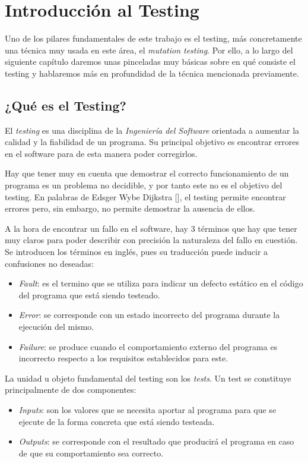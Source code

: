\chapter{Introducción al Testing}
Uno de los pilares fundamentales de este trabajo es el testing, más concretamente una técnica muy usada en este área, el \textit{mutation testing}. Por ello, a lo largo del siguiente capítulo daremos 
unas pinceladas muy básicas sobre en qué consiste el testing y hablaremos más en profundidad  de la técnica mencionada previamente.

\section{¿Qué es el Testing?}

El \emph{testing} es una disciplina de la \textit{Ingeniería del Software} orientada a aumentar la calidad y la fiabilidad de un programa. Su principal objetivo es encontrar errores en el software para de esta manera poder corregirlos.

Hay que tener muy en cuenta que demostrar el correcto funcionamiento de un programa es un problema no decidible, y por tanto este no es el objetivo del testing. En palabras de Edsger Wybe Dijkstra [\cite{dijkstra1972chapter}], el testing permite encontrar errores pero, sin embargo, no permite demostrar la ausencia de ellos.

A la hora de encontrar un fallo en el software, hay 3 términos que hay que tener muy claros para poder describir con precisión la naturaleza del fallo en cuestión. Se introducen los términos en inglés, pues su traducción puede inducir a confusiones no deseadas:
\begin{itemize}
\item \emph{Fault}: es el termino que se utiliza para indicar un defecto estático en el código del programa que está siendo testeado.
\item \emph{Error}: se corresponde con un estado incorrecto del programa durante la ejecución del mismo.
\item \emph{Failure}: se produce cuando el comportamiento externo del programa es incorrecto respecto a los requisitos establecidos para este.
\end{itemize}

La unidad u objeto fundamental del testing son los \emph{tests}. Un test se constituye principalmente de dos componentes:
\begin{itemize}
\item \emph{Inputs}: son los valores que se necesita aportar al programa para que se ejecute de la forma concreta que está siendo testeada.
\item \emph{Outputs}: se corresponde con el resultado que producirá el programa en caso de que su comportamiento sea correcto.
\end{itemize}

